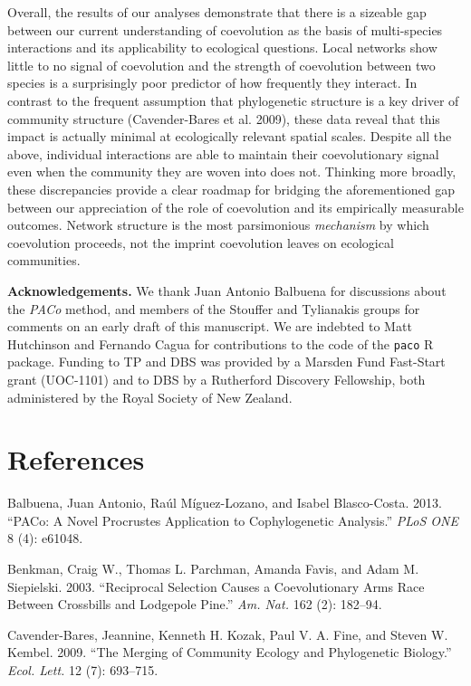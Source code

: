 \documentclass[12pt]{article}
\begin{document}
Overall, the results of our analyses demonstrate that there is a
sizeable gap between our current understanding of coevolution as the
basis of multi-species interactions and its applicability to ecological
questions. Local networks show little to no signal of coevolution and
the strength of coevolution between two species is a surprisingly poor
predictor of how frequently they interact. In contrast to the frequent
assumption that phylogenetic structure is a key driver of community
structure (Cavender-Bares et al. 2009), these data reveal that this
impact is actually minimal at ecologically relevant spatial scales.
Despite all the above, individual interactions are able to maintain
their coevolutionary signal even when the community they are woven into
does not. Thinking more broadly, these discrepancies provide a clear
roadmap for bridging the aforementioned gap between our appreciation of
the role of coevolution and its empirically measurable outcomes. Network
structure is the most parsimonious \emph{mechanism} by which coevolution
proceeds, not the imprint coevolution leaves on ecological communities.

\textbf{Acknowledgements.} We thank Juan Antonio Balbuena for
discussions about the \emph{PACo} method, and members of the Stouffer
and Tylianakis groups for comments on an early draft of this manuscript.
We are indebted to Matt Hutchinson and Fernando Cagua for contributions
to the code of the \texttt{paco} R package. Funding to TP and DBS was
provided by a Marsden Fund Fast-Start grant (UOC-1101) and to DBS by a
Rutherford Discovery Fellowship, both administered by the Royal Society
of New Zealand.

\section*{References}\label{references}

Balbuena, Juan Antonio, Ra{ú}l M{í}guez-Lozano, and Isabel Blasco-Costa.
2013. ``PACo: A Novel Procrustes Application to Cophylogenetic
Analysis.'' \emph{PLoS ONE} 8 (4): e61048.

Benkman, Craig W., Thomas L. Parchman, Amanda Favis, and Adam M.
Siepielski. 2003. ``Reciprocal Selection Causes a Coevolutionary Arms
Race Between Crossbills and Lodgepole Pine.'' \emph{Am. Nat.} 162 (2):
182--94.

Cavender-Bares, Jeannine, Kenneth H. Kozak, Paul V. A. Fine, and Steven
W. Kembel. 2009. ``The Merging of Community Ecology and Phylogenetic
Biology.'' \emph{Ecol. Lett.} 12 (7): 693--715.
\end{document}
